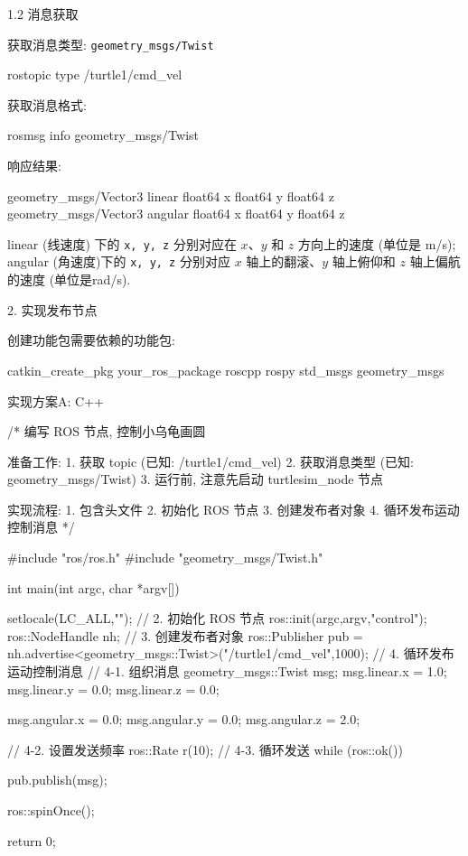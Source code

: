 \documentclass[openany, fontset=windowsold]{ctexbook}
\theoremstyle{kaiti}
\theoremstyle{normal}
\begin{document}
1.2 消息获取

获取消息类型: \verb|geometry_msgs/Twist|

\begin{bash}
  rostopic type /turtle1/cmd_vel
\end{bash}

获取消息格式:

\begin{bash}
  rosmsg info geometry_msgs/Twist
\end{bash}

响应结果:

\begin{bash}
  geometry_msgs/Vector3 linear
    float64 x
    float64 y
    float64 z
  geometry_msgs/Vector3 angular
    float64 x
    float64 y
    float64 z
\end{bash}

linear (线速度) 下的 \verb|x, y, z| 分别对应在 $x$、$y$ 和 $z$ 方向上的速度 (单位是 m/s); angular (角速度)下的 \verb|x, y, z| 分别对应 $x$ 轴上的翻滚、$y$ 轴上俯仰和 $z$ 轴上偏航的速度 (单位是rad/s).

2. 实现发布节点

创建功能包需要依赖的功能包: 

\begin{bash}
  catkin_create_pkg your_ros_package roscpp rospy std_msgs geometry_msgs
\end{bash}

实现方案A: C++

\begin{cpp}
  /*
      编写 ROS 节点, 控制小乌龟画圆

      准备工作:
          1. 获取 topic (已知: /turtle1/cmd_vel)
          2. 获取消息类型 (已知: geometry_msgs/Twist)
          3. 运行前, 注意先启动 turtlesim_node 节点

      实现流程:
          1. 包含头文件
          2. 初始化 ROS 节点
          3. 创建发布者对象
          4. 循环发布运动控制消息
  */

  #include "ros/ros.h"
  #include "geometry_msgs/Twist.h"

  int main(int argc, char *argv[])
  {
      setlocale(LC_ALL,"");
      // 2. 初始化 ROS 节点
      ros::init(argc,argv,"control");
      ros::NodeHandle nh;
      // 3. 创建发布者对象
      ros::Publisher pub = nh.advertise<geometry_msgs::Twist>("/turtle1/cmd_vel",1000);
      // 4. 循环发布运动控制消息
      // 4-1. 组织消息
      geometry_msgs::Twist msg;
      msg.linear.x = 1.0;
      msg.linear.y = 0.0;
      msg.linear.z = 0.0;

      msg.angular.x = 0.0;
      msg.angular.y = 0.0;
      msg.angular.z = 2.0;

      // 4-2. 设置发送频率
      ros::Rate r(10);
      // 4-3. 循环发送
      while (ros::ok())
      {
          pub.publish(msg);

          ros::spinOnce();
      }


      return 0;
  }
\end{cpp}
\end{document}
